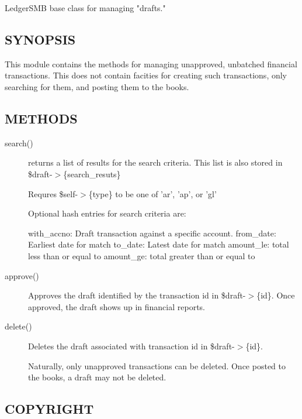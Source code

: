 \begin{description}
\begin{description}
\begin{description}
\begin{description}
\begin{description}
\begin{description}
\begin{description}
\begin{description}
\begin{description}
LedgerSMB base class for managing "drafts."

\subsection*{SYNOPSIS\label{LedgerSMB::DBObject::Draft_SYNOPSIS}}


This module contains the methods for managing unapproved, unbatched financial 
transactions.  This does not contain facities for creating such transactions, 
only searching for them, and posting them to the books.

\subsection*{METHODS\label{LedgerSMB::DBObject::Draft_METHODS}}
\begin{description}

\item[{search()}] \mbox{}

returns a list of results for the search criteria.  This list is also stored 
in \$draft-$>$\{search\_resuts\}



Requres \$self-$>$\{type\} to be one of 'ar', 'ap', or 'gl'



Optional hash entries for search criteria are:



with\_accno: Draft transaction against a specific account.
from\_date:  Earliest date for match
to\_date: Latest date for match
amount\_le: total less than or equal to
amount\_ge: total greater than or equal to


\item[{approve()}] \mbox{}

Approves the draft identified by the transaction id in \$draft-$>$\{id\}.  Once
approved, the draft shows up in financial reports.


\item[{delete()}] \mbox{}

Deletes the draft associated with transaction id in \$draft-$>$\{id\}.



Naturally, only unapproved transactions can be deleted.  Once posted to the
books, a draft may not be deleted.

\end{description}
\subsection*{COPYRIGHT\label{LedgerSMB::DBObject::Draft_COPYRIGHT}}



\end{description}
\end{description}
\end{description}
\end{description}
\end{description}
\end{description}
\end{description}
\end{description}
\end{description}
